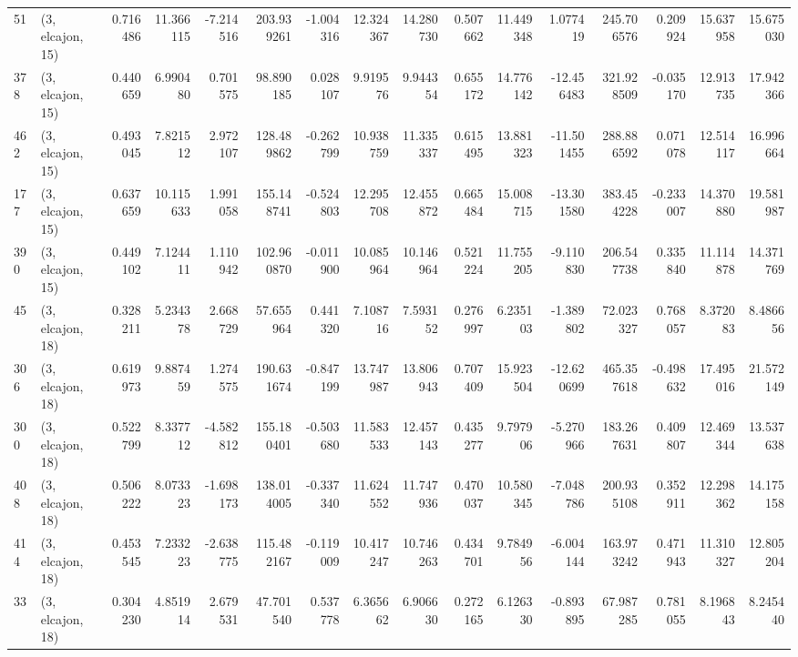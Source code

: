 \begin{tabular}{llrrrrrrrrrrrrrr}
51  &  (3, elcajon, 15) &   0.716486 &  11.366115 &  -7.214516 &   203.939261 &  -1.004316 &  12.324367 &  14.280730 &  0.507662 &  11.449348 &   1.077419 &   245.706576 &  0.209924 &  15.637958 &  15.675030 \\
378 &  (3, elcajon, 15) &   0.440659 &   6.990480 &   0.701575 &    98.890185 &   0.028107 &   9.919576 &   9.944354 &  0.655172 &  14.776142 & -12.456483 &   321.928509 & -0.035170 &  12.913735 &  17.942366 \\
462 &  (3, elcajon, 15) &   0.493045 &   7.821512 &   2.972107 &   128.489862 &  -0.262799 &  10.938759 &  11.335337 &  0.615495 &  13.881323 & -11.501455 &   288.886592 &  0.071078 &  12.514117 &  16.996664 \\
177 &  (3, elcajon, 15) &   0.637659 &  10.115633 &   1.991058 &   155.148741 &  -0.524803 &  12.295708 &  12.455872 &  0.665484 &  15.008715 & -13.301580 &   383.454228 & -0.233007 &  14.370880 &  19.581987 \\
390 &  (3, elcajon, 15) &   0.449102 &   7.124411 &   1.110942 &   102.960870 &  -0.011900 &  10.085964 &  10.146964 &  0.521224 &  11.755205 &  -9.110830 &   206.547738 &  0.335840 &  11.114878 &  14.371769 \\
45  &  (3, elcajon, 18) &   0.328211 &   5.234378 &   2.668729 &    57.655964 &   0.441320 &   7.108716 &   7.593152 &  0.276997 &   6.235103 &  -1.389802 &    72.023327 &  0.768057 &   8.372083 &   8.486656 \\
306 &  (3, elcajon, 18) &   0.619973 &   9.887459 &   1.274575 &   190.631674 &  -0.847199 &  13.747987 &  13.806943 &  0.707409 &  15.923504 & -12.620699 &   465.357618 & -0.498632 &  17.495016 &  21.572149 \\
300 &  (3, elcajon, 18) &   0.522799 &   8.337712 &  -4.582812 &   155.180401 &  -0.503680 &  11.583533 &  12.457143 &  0.435277 &   9.797906 &  -5.270966 &   183.267631 &  0.409807 &  12.469344 &  13.537638 \\
408 &  (3, elcajon, 18) &   0.506222 &   8.073323 &  -1.698173 &   138.014005 &  -0.337340 &  11.624552 &  11.747936 &  0.470037 &  10.580345 &  -7.048786 &   200.935108 &  0.352911 &  12.298362 &  14.175158 \\
414 &  (3, elcajon, 18) &   0.453545 &   7.233223 &  -2.638775 &   115.482167 &  -0.119009 &  10.417247 &  10.746263 &  0.434701 &   9.784956 &  -6.004144 &   163.973242 &  0.471943 &  11.310327 &  12.805204 \\
33  &  (3, elcajon, 18) &   0.304230 &   4.851914 &   2.679531 &    47.701540 &   0.537778 &   6.365662 &   6.906630 &  0.272165 &   6.126330 &  -0.893895 &    67.987285 &  0.781055 &   8.196843 &   8.245440 \\

\end{tabular}
